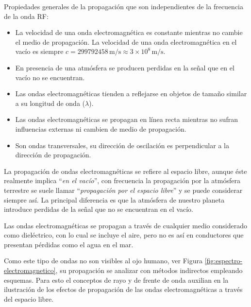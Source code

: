 \begin{tcolorbox}{Propiedades generales de la propagaci\'on que son independientes de la frecuencia de la onda RF:}{\small
  \begin{itemize}

  \item La velocidad de una onda electromagn\'etica es constante
    mientras no cambie el medio de propagaci\'on.
 La velocidad de una onda electromagn\'etica en el vac\'io es
    siempre $c = 299792458 \,\text{m/s} \approx 3 \times 10^8 \,\text{m/s}$.

  \item En presencia de una atmósfera se producen perdidas en la señal que en el vacío no se encuentran.

  \item Las ondas electromagn\'eticas tienden a reflejarse en objetos
    de tama\~no similar a su longitud de onda ($\lambda$).

  \item Las ondas electromagn\'eticas se propagan en l\'inea recta
    mientras no sufran influencias externas ni cambien de medio de
    propagaci\'on.

  \item Son ondas transversales, su direcci\'on de oscilaci\'on es perpendicular a la direcci\'on de propagaci\'on.
  \end{itemize}
  }
\end{tcolorbox}

La propagación de ondas  electromagnéticas se refiere al espacio libre, aunque \'este realmente 
implica ``\emph{en el vacío}'', con frecuencia la
propagación por la atmósfera terrestre se suele llamar ``\emph{propagación por el espacio libre}''
 y se puede considerar siempre así. 
La principal diferencia es que la atmósfera de nuestro planeta introduce
perdidas de la señal que no se encuentran en el vacío.

Las ondas electromagnéticas se propagan a través de cualquier medio considerado como  dieléctrico,
con lo cual se incluye el aire, pero no es as\'i en conductores que presentan p\'erdidas como el
agua en el mar.

Como este tipo de ondas no son visibles al ojo humano, ver Figura \ref{fig:espectro-electromagnetico},
 su propagaci\'on  se  analizar con métodos indirectos empleando esquemas. 
Para esto el conceptos de rayo y de frente de onda auxilian en la ilustraci\'on
de los efectos de propagación de las ondas electromagnéticas a través
del espacio libre. 

